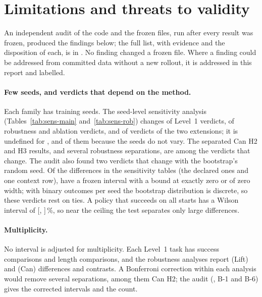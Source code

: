 \section{Limitations and threats to validity}
\label{sec:limitations}

An independent audit of the code and the frozen files, run after every result was frozen,
produced the findings below; the full list, with evidence and the disposition of each, is in
. No finding changed a frozen file. Where a finding could be addressed from
committed data without a new rollout, it is addressed in this report and labelled.

\paragraph{Few seeds, and verdicts that depend on the method.} Each family has
 training seeds. The seed-level sensitivity analysis
(Tables~\ref{tab:sens-main} and~\ref{tab:sens-rob}) changes
 of  Level~1 verdicts,  of
 robustness and ablation verdicts, and  of
 verdicts of the two extensions; it is undefined for
,  and  of them because
the seeds do not vary. The separated Can H2 and H3 results, and several robustness
separations, are among the verdicts that change. The audit also found two verdicts that change
with the bootstrap's random seed. Of the  differences in the sensitivity
tables (the declared ones and one context row),  have a frozen interval
with a bound at exactly zero or of zero width; with  binary outcomes per seed the bootstrap distribution is
discrete, so these verdicts rest on ties. A policy that succeeds on all 
starts has a Wilson interval of [, ]\,\%, so near the
ceiling the test separates only large differences.

\paragraph{Multiplicity.} No interval is adjusted for multiplicity. Each Level~1 task has
 success comparisons and  length comparisons, and
the robustness analyses report  (Lift) and 
(Can) differences and contrasts. A Bonferroni correction within each analysis would remove several separations, among them
Can H2; the audit (, B-1 and B-6) gives the corrected intervals and the
count.

